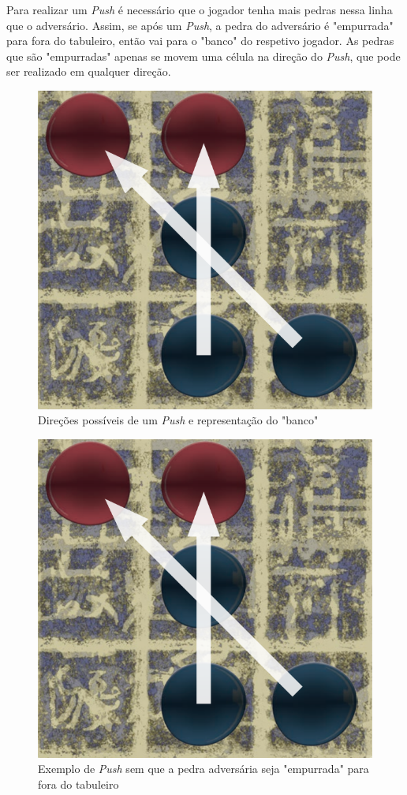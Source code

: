 \documentclass[a4paper]{article}
\begin{document}
Para realizar um  \textit{Push} é necessário que o jogador tenha mais pedras nessa linha que o adversário. Assim, se após um  \textit{Push}, a pedra do adversário é "empurrada" para fora do tabuleiro, então vai para o "banco" do respetivo jogador. As pedras que são "empurradas" apenas se movem uma célula na direção do \textit{Push}, que pode ser realizado em qualquer direção.

\begin{figure}[!htb]
\centering
\includegraphics[scale=0.3]{push.png} 
\caption{Direções possíveis de um \textit{Push} e representação do "banco"}
\end{figure}

\begin{figure}[!htb]
\centering
\includegraphics[scale=0.3]{push.png} 
\caption{Exemplo de \textit{Push} sem que a pedra adversária seja "empurrada" para fora do tabuleiro}
\end{figure}
\end{document}

